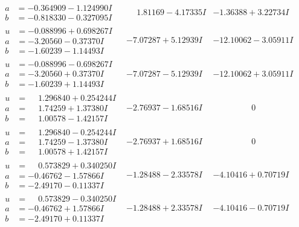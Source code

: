 \documentclass[1p]{elsarticle_modified}
\theoremstyle{definition}
\begin{document}
$$\begin{array}{c|c|c}
\begin{aligned}
a &= -0.364909 - 1.124990 I \\
b &= -0.818330 - 0.327095 I\end{aligned}
 & \phantom{-}1.81169 - 4.17335 I & -1.36388 + 3.22734 I \\ \hline\begin{aligned}
u &= -0.088996 + 0.698267 I \\
a &= -3.20560 - 0.37370 I \\
b &= -1.60239 - 1.14493 I\end{aligned}
 & -7.07287 + 5.12939 I & -12.10062 - 3.05911 I \\ \hline\begin{aligned}
u &= -0.088996 - 0.698267 I \\
a &= -3.20560 + 0.37370 I \\
b &= -1.60239 + 1.14493 I\end{aligned}
 & -7.07287 - 5.12939 I & -12.10062 + 3.05911 I \\ \hline\begin{aligned}
u &= \phantom{-}1.296840 + 0.254244 I \\
a &= \phantom{-}1.74259 + 1.37380 I \\
b &= \phantom{-}1.00578 - 1.42157 I\end{aligned}
 & -2.76937 - 1.68516 I & \phantom{-0.000000 } 0 \\ \hline\begin{aligned}
u &= \phantom{-}1.296840 - 0.254244 I \\
a &= \phantom{-}1.74259 - 1.37380 I \\
b &= \phantom{-}1.00578 + 1.42157 I\end{aligned}
 & -2.76937 + 1.68516 I & \phantom{-0.000000 } 0 \\ \hline\begin{aligned}
u &= \phantom{-}0.573829 + 0.340250 I \\
a &= -0.46762 - 1.57866 I \\
b &= -2.49170 - 0.11337 I\end{aligned}
 & -1.28488 - 2.33578 I & -4.10416 + 0.70719 I \\ \hline\begin{aligned}
u &= \phantom{-}0.573829 - 0.340250 I \\
a &= -0.46762 + 1.57866 I \\
b &= -2.49170 + 0.11337 I\end{aligned}
 & -1.28488 + 2.33578 I & -4.10416 - 0.70719 I \\ \hline\begin{aligned}

\end{aligned}
\end{array}$$
\end{document}
